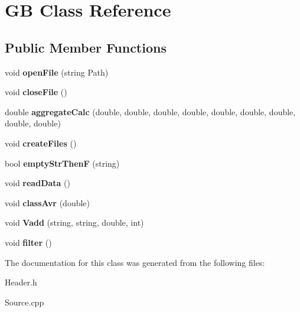 \hypertarget{class_g_b}{}\section{GB Class Reference}
\label{class_g_b}
\subsection*{Public Member Functions}
\begin{DoxyCompactItemize}
\item 
\mbox{\label{class_g_b_ada3e201edf9151c4ade8d357e82b8b48}} 
void {\bfseries open\+File} (string Path)
\item 
\mbox{\label{class_g_b_a4658c12fe7fe8158ed3764f1b7fa0ef1}} 
void {\bfseries close\+File} ()
\item 
\mbox{\label{class_g_b_a86141c1317f33fc4619f41bec2b6112f}} 
double {\bfseries aggregate\+Calc} (double, double, double, double, double, double, double, double, double)
\item 
\mbox{\label{class_g_b_aa4f9cd55ebf348a4b707c141af0968e0}} 
void {\bfseries create\+Files} ()
\item 
\mbox{\label{class_g_b_a64d820f8afe9a6613498f6633f7cc783}} 
bool {\bfseries empty\+Str\+ThenF} (string)
\item 
\mbox{\label{class_g_b_a8bb4f851c9ba8155fdfc7fb297640df0}} 
void {\bfseries read\+Data} ()
\item 
\mbox{\label{class_g_b_a2dd8491b33bd6b1baf487988e5250c5b}} 
void {\bfseries class\+Avr} (double)
\item 
\mbox{\label{class_g_b_a6dbdc3b16721360a2a44a967ce563795}} 
void {\bfseries Vadd} (string, string, double, int)
\item 
\mbox{\label{class_g_b_a391ea1728a6e63265648ba0f7702475a}} 
void {\bfseries filter} ()
\end{DoxyCompactItemize}


The documentation for this class was generated from the following files\+:\begin{DoxyCompactItemize}
\item 
Header.\+h\item 
Source.\+cpp\end{DoxyCompactItemize}
